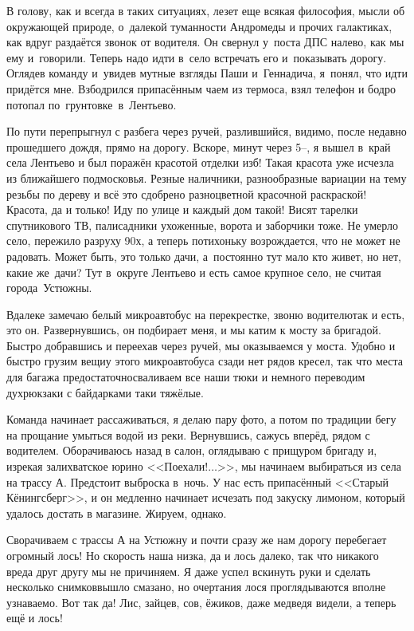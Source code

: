 В голову, как и всегда в таких ситуациях, лезет еще всякая философия, мысли об окружающей природе, о~далекой туманности Андромеды и прочих галактиках, как вдруг раздаётся звонок от водителя. Он свернул у~поста ДПС налево, как мы ему и~говорили. Теперь надо идти в~село встречать его и~показывать дорогу. Оглядев команду и~увидев мутные взгляды Паши и~Геннадича, я~понял, что идти придётся мне. Взбодрился припасённым чаем из термоса, взял телефон и бодро потопал по~грунтовке~в~Лентьево. 
 
По пути перепрыгнул с разбега через ручей, разлившийся, видимо, после недавно прошедшего дождя, прямо на дорогу. Вскоре, минут через 5\thinspace\nobreakdash--, я вышел в~край села Лентьево и был поражён красотой отделки изб! Такая красота уже исчезла из ближайшего подмосковья. Резные наличники, разнообразные вариации на тему резьбы по дереву и всё это сдобрено разноцветной красочной раскраской! Красота, да и только! Иду по улице и каждый дом такой! Висят тарелки спутникового ТВ, палисадники ухоженные, ворота и заборчики тоже. Не умерло село, пережило разруху 90\sdash х, а теперь потихоньку возрождается, что не может не радовать. Может быть, это только дачи, а~постоянно тут мало кто живет, но нет, какие же~дачи? Тут в~округе Лентьево и есть самое крупное село, не считая города~Устюжны.

Вдалеке замечаю белый микроавтобус на перекрестке, звоню водителю\mdash так и есть, это он. Развернувшись, он подбирает меня, и мы катим к мосту за бригадой. Быстро добравшись и переехав через ручей, мы оказываемся у моста. Удобно и быстро грузим вещи\mdash у этого микроавтобуса сзади нет рядов кресел, так что места для багажа предостаточно\mdash сваливаем все наши тюки и немного переводим дух\mdash рюкзаки с байдарками таки тяжёлые. 

Команда начинает рассаживаться, я делаю пару фото, а потом по традиции бегу на прощание умыться водой из реки. Вернувшись, сажусь вперёд, рядом с водителем. Оборачиваюсь назад в салон, оглядываю с прищуром бригаду и, изрекая залихватское юрино <<Поехали!$\ldots$>>, мы начинаем выбираться из села на трассу А. Предстоит выброска в~ночь. У нас есть припасённый <<Старый Кёнингсберг>>, и он медленно начинает исчезать под закуску лимоном, который удалось достать в магазине. Жируем, однако.

Сворачиваем с трассы А на Устюжну и почти сразу же нам дорогу перебегает огромный лось! Но скорость наша низка, да и лось далеко, так что никакого вреда друг другу мы не причиняем. Я даже успел вскинуть руки и сделать несколько снимков\mdash вышло смазано, но очертания лося проглядываются вполне узнаваемо. Вот так да! Лис, зайцев, сов, ёжиков, даже медведя видели, а теперь ещё и лось! 

